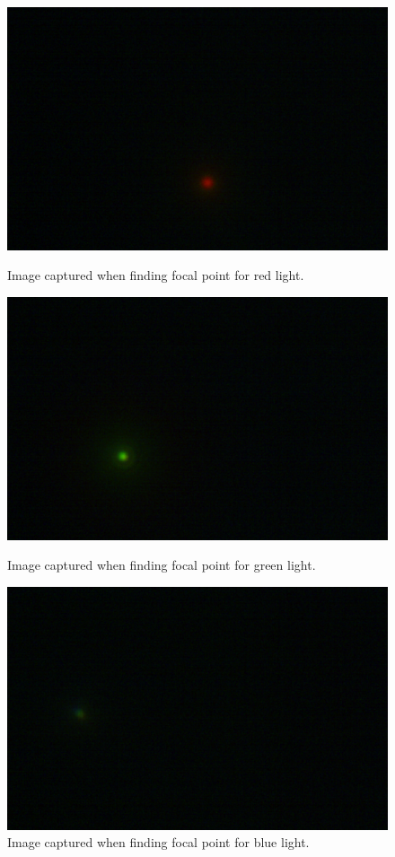 \documentclass{emulateapj}
\begin{document}
\begin{appendices}
\begin{figure}[h!]
	\begin{minipage}{.33\textwidth}
	\centering
	\includegraphics[width=0.75\linewidth]{./images/ex2/cali_red.pdf}
	\caption{Image captured when finding focal point for red light.}
	\end{minipage}%
	\begin{minipage}{.33\textwidth}
	\centering
	\includegraphics[width=0.75\linewidth]{./images/ex2/cali_green.pdf}
		\caption{Image captured when finding focal point for green light.}
	\end{minipage}%
	\begin{minipage}{.33\textwidth}
	\centering
	\includegraphics[width=0.75\linewidth]{./images/ex2/cali_blue.pdf}
		\caption{Image captured when finding focal point for blue light.}
	\end{minipage}
\end{figure}
\clearpage


\end{appendices}
\end{document}
